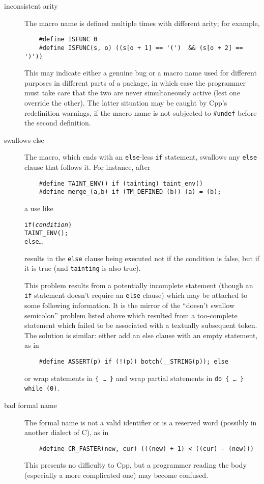 \documentclass[10pt]{article}
\begin{document}
\begin{description}
\item[inconsistent arity]
        The macro name is defined multiple times with different arity; for example,
\begin{verbatim}
    #define ISFUNC 0
    #define ISFUNC(s, o) ((s[o + 1] == '(')  && (s[o + 2] == ')'))
\end{verbatim}
        This may indicate either a genuine bug or a macro name used for
        different purposes in different parts of a package, in which case
        the programmer must take care that the two are never simultaneously
        active (lest one override the other).  The latter situation may be
        caught by Cpp's redefinition warnings, if the macro name is not
        subjected to {\tt \#undef} before the second definition.

\item[swallows else]
        The macro, which ends with an {\tt else}-less {\tt if} statement,
        swallows any {\tt else} clause that follows it.  For instance, after
\begin{verbatim}
    #define TAINT_ENV() if (tainting) taint_env()
    #define merge_(a,b) if (TM_DEFINED (b)) (a) = (b);
\end{verbatim}
        a use like
\begin{alltt}
    if ({\rm\em{}condition})
      TAINT_ENV();
    else \ldots
\end{alltt}
        results in the {\tt else} clause being executed not if  the
        condition is false, but if it is true (and {\tt tainting} is also
        true).
        
        This problem results from a potentially incomplete statement (though
        an {\tt if} statement doesn't require an {\tt else} clause) which
        may be attached to some following information.  It is the mirror of
        the ``doesn't swallow semicolon'' problem listed above which
        resulted from a too-complete statement which failed to be
        associated with a textually subsequent token.  The solution is
        similar: either add an else clause with an empty statement, as in
\begin{verbatim}
    #define ASSERT(p) if (!(p)) botch(__STRING(p)); else
\end{verbatim}
        or wrap statements in {\tt \verb|{| \ldots\ \verb|}|} and wrap
        partial statements in {\tt do \verb|{| {\rm \ldots}\ \verb|}| while
        (0)}.

\item[bad formal name]
        The formal name is not a valid identifier or is a reserved word
        (possibly in another dialect of C), as in
\begin{verbatim}
    #define CR_FASTER(new, cur) (((new) + 1) < ((cur) - (new)))
\end{verbatim}
        This presents no difficulty to Cpp, but a programmer reading the
        body (especially a more complicated one) may become confused.

\end{description}
\end{document}
